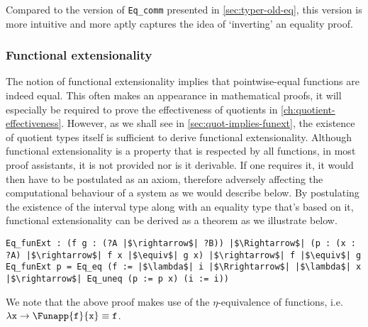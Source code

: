 \documentclass[12pt,twoside,maitrise]{dms}
\theoremstyle{definition}
\numberwithin{equation}{section}
\numberwithin{table}{chapter}
\numberwithin{figure}{chapter}
\newcommand\id[1] {\texttt{#1}}
\begin{document}
Compared to the version of \id{Eq\_comm} presented in
\autoref{sec:typer-old-eq}, this version is more intuitive and more aptly
captures the idea of `inverting' an equality proof.

\subsubsection*{Functional extensionality}\label{subsec:funext}
The notion of functional extensionality implies that pointwise-equal functions
are indeed equal. This often makes an appearance in mathematical proofs, it will
especially be required to prove the effectiveness of quotients in
\autoref{ch:quotient-effectiveness}. However, as we shall see in
\autoref{sec:quot-implies-funext}, the existence of quotient types itself is
sufficient to derive functional extensionality. Although functional
extensionality is a property that is respected by all functions, in most proof
assistants, it is not provided nor is it derivable. If one requires it, it would
then have to be postulated as an axiom, therefore adversely affecting the
computational behaviour of a system as we would describe below. By postulating
the existence of the interval type along with an equality type that's
based on it, functional extensionality can be derived as a theorem as we
illustrate below.

\begin{verbatim}
Eq_funExt : (f g : (?A |$\rightarrow$| ?B)) |$\Rightarrow$| (p : (x : ?A) |$\rightarrow$| f x |$\equiv$| g x) |$\rightarrow$| f |$\equiv$| g
Eq_funExt p = Eq_eq (f := |$\lambda$| i |$\Rrightarrow$| |$\lambda$| x |$\rightarrow$| Eq_uneq (p := p x) (i := i))
\end{verbatim}

We note that the above proof makes use of the $\eta$-equivalence of functions,
i.e. $\lambda \id{x} \rightarrow \Funapp{\id{f}}{\id{x}} \equiv \id{f}$.


\end{document}
